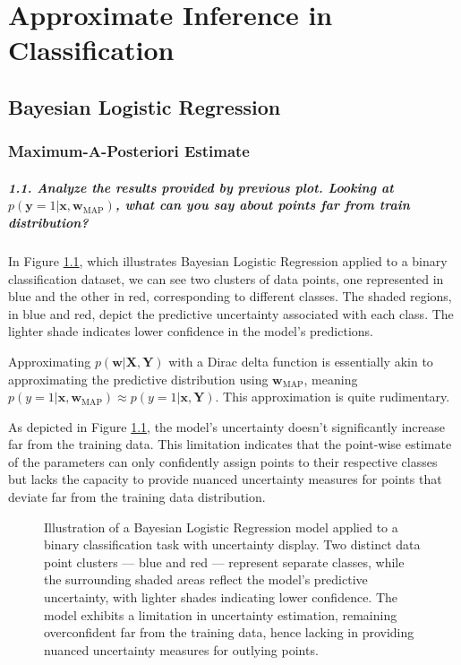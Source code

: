 \graphicspath{{figs/3b}}

\chapter{Approximate Inference in Classification}
\section{Bayesian Logistic Regression}
\subsection{Maximum-A-Posteriori Estimate}
\paragraph{1.1. Analyze the results provided by previous plot. Looking at $p(\mathbf{y}=1 | \pmb{x}, \pmb{w}_{\textrm{MAP}})$, what can you say about points far from train distribution?}
In Figure \ref{fig:bayes_MAP}, which illustrates Bayesian Logistic Regression applied to a binary classification dataset, we can see two clusters of data points, one represented in blue and the other in red, corresponding to different classes. The shaded regions, in blue and red, depict the predictive uncertainty associated with each class. The lighter shade indicates lower confidence in the model's predictions.

Approximating $p(\mathbf{w} | \mathbf{X}, \mathbf{Y})$ with a Dirac delta function is essentially akin to approximating the predictive distribution using $\mathbf{w}_{\textrm{MAP}}$, meaning $p(y=1 | \mathbf{x}, \mathbf{w}_{\textrm{MAP}}) \approx p(y=1 | \mathbf{x}, \mathbf{Y})$. This approximation is quite rudimentary.

As depicted in Figure \ref{fig:bayes_MAP}, the model's uncertainty doesn't significantly increase far from the training data. This limitation indicates that the point-wise estimate of the parameters can only confidently assign points to their respective classes but lacks the capacity to provide nuanced uncertainty measures for points that deviate far from the training data distribution.

\begin{figure}[H]
    \centering
    \caption{Illustration of a Bayesian Logistic Regression model applied to a binary classification task with uncertainty display. Two distinct data point clusters — blue and red — represent separate classes, while the surrounding shaded areas reflect the model's predictive uncertainty, with lighter shades indicating lower confidence. The model exhibits a limitation in uncertainty estimation, remaining overconfident far from the training data, hence lacking in providing nuanced uncertainty measures for outlying points.}
    \label{fig:bayes_MAP}
\end{figure}

